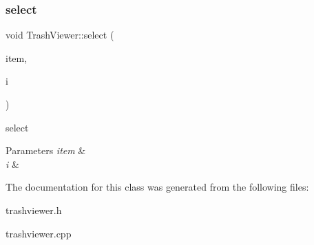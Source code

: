 \subsubsection{\texorpdfstring{select}{select}}
{\footnotesize\ttfamily void Trash\+Viewer\+::select (\begin{DoxyParamCaption}\item[{Q\+Tree\+Widget\+Item $\ast$}]{item,  }\item[{int}]{i }\end{DoxyParamCaption})\hspace{0.3cm}{\ttfamily [slot]}}



select 


\begin{DoxyParams}{Parameters}
{\em item} & \\
\hline
{\em i} & \\
\hline
\end{DoxyParams}


The documentation for this class was generated from the following files\+:\begin{DoxyCompactItemize}
\item 
trashviewer.\+h\item 
trashviewer.\+cpp\end{DoxyCompactItemize}
